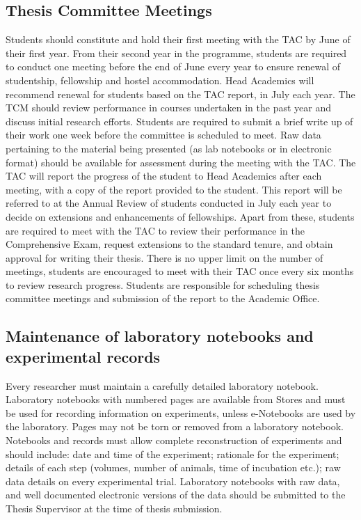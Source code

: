 \documentclass[a4paper]{extarticle}
\begin{document}
\subsection{Thesis Committee Meetings}
Students should constitute and hold their first meeting with
the TAC by June of their first year. From their second year in the programme,
students are required to conduct one meeting before the end of June every year
to ensure renewal of studentship, fellowship and hostel accommodation. Head
Academics will recommend renewal for students based on the TAC report, in July
each year. The TCM should review performance in courses undertaken in the past
year and discuss initial research efforts.  Students are required to submit a
brief write up of their work one week before the committee is scheduled to meet. 
Raw data pertaining to the material being presented (as lab notebooks
or in electronic format) should be available for assessment during the meeting with the
TAC. The TAC will report the progress of the student to Head Academics after each
meeting, with a copy of the report provided to the student. This report will be referred to at
the Annual Review of students conducted in July each year to decide on extensions and
enhancements of fellowships. Apart from these, students are required to meet with the TAC
to review their performance in the Comprehensive Exam, request extensions to the standard
tenure, and obtain approval for writing their thesis. There is no upper limit on the number of
meetings, students are encouraged to meet with their TAC once every six months to review
research progress. Students are responsible for scheduling thesis committee meetings and
submission of the report to the Academic Office.

\subsection{Maintenance of laboratory notebooks and experimental records} Every
researcher must maintain a carefully detailed laboratory notebook. Laboratory
notebooks with numbered pages are available from Stores and must be used for
recording information on experiments, unless e-Notebooks are used by the
laboratory. Pages may not be torn or removed from a laboratory notebook.
Notebooks and records must allow complete reconstruction of experiments and
should include: date and time of the experiment; rationale for the experiment;
details of each step (volumes, number of animals, time of incubation etc.); raw
data details on every experimental trial. Laboratory notebooks with raw data,
and well documented electronic versions of the data should be submitted to the
Thesis Supervisor at the time of thesis submission.
\end{document}
